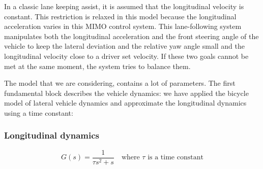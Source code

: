 \documentclass[conference, 11pt]{IEEEtran}
\begin{document}
In a classic lane keeping assist, it is assumed that the longitudinal velocity is constant. This restriction is relaxed in this model because the longitudinal acceleration varies in this MIMO control system. This lane-following system manipulates both the longitudinal acceleration and the front steering angle of the vehicle to keep the lateral deviation and the relative yaw angle small and the longitudinal velocity close to a driver set velocity. If these two goals cannot be met at the same moment, the system tries to balance them.

The model that we are considering, contains a lot of parameters. The first fundamental block describes the vehicle dynamics: we have applied the bicycle model of lateral vehicle dynamics and approximate the longitudinal dynamics using a time constant:
\subsubsection{Longitudinal dynamics}
\begin{equation}
	\label{eqn:longi_dynamics_simple_model}
	G(s)=\frac{1}{\tau s^2+s} \quad \text{where $\tau$ is a time constant}
\end{equation}
\end{document}
